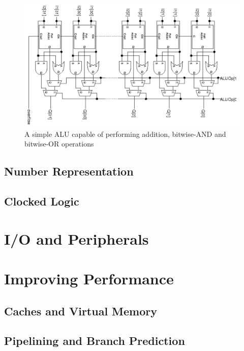 \documentclass{article}
\begin{document}
	\begin{figure}[ht]
		\centering
		\includegraphics[width=1\textwidth]{simple_ALU}
		\caption{A simple ALU capable of performing addition, bitwise-AND and bitwise-OR operations}
		\label{fig:simple ALU}
	\end{figure}	
	
	\subsection{Number Representation}
	\subsection{Clocked Logic}
	
	\section{I/O and Peripherals}
	
	\section{Improving Performance}
	\subsection{Caches and Virtual Memory}
	\subsection{Pipelining and Branch Prediction}
	
	\newpage
	\listoffigures
	\printindex	
\end{document}
